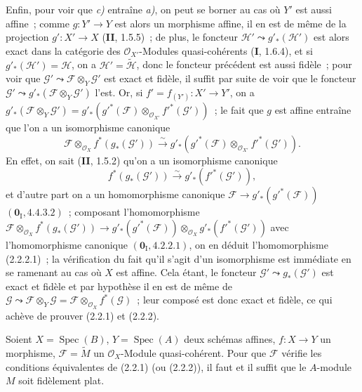 Enfin, pour voir que \emph{c)} entraîne \emph{a)}, on peut se borner au cas
où $Y'$ est aussi affine~; comme $g:Y'\to Y$ est alors un morphisme affine,
il en est de même de la projection $g':X'\to X$ (\textbf{II}, 1.5.5)~; de plus, le
foncteur $\mathscr H'\leadsto g'_*(\mathscr H')$ est alors exact dans la
catégorie des $\mathcal O_{X'}$-Modules quasi-cohérents (\textbf{I}, 1.6.4), et si
$g'_*(\mathscr H')=\mathscr H$, on a $\mathscr H'=\widetilde{\mathscr H}$,
donc le foncteur précédent est aussi fidèle~; pour voir que
$\mathscr G'\leadsto\mathscr F\otimes_Y\mathscr G'$ est exact et fidèle, il
suffit par suite de voir que le foncteur
$\mathscr G'\leadsto g'_*(\mathscr F\otimes_Y\mathscr G')$
l'est. Or, si $f'=f_{(Y')}:X'\to Y'$, on a
$g'_*(\mathscr F\otimes_Y\mathscr G')
=g'_*(g'^*(\mathscr F)\otimes_{\mathcal O_{X'}}f'^*(\mathscr G'))$~; le fait que $g$ est
affine entraîne que l'on a un isomorphisme canonique
\begin{equation}
\tag{2.2.2.1}
\label{IV.2.2.2.1-fr}
\mathscr F\otimes_{\mathcal O_X}f^*(g_*(\mathscr G'))
\xrightarrow{\sim}
g'_*(g'^*(\mathscr F)\otimes_{\mathcal O_{X'}}f'^*(\mathscr G')).
\end{equation}
En effet, on sait (\textbf{II}, 1.5.2) qu'on a un isomorphisme canonique
\[
f^*(g_*(\mathscr G'))\xrightarrow{\sim}g'_*(f'^*(\mathscr G')),
\]
et d'autre part on a un homomorphisme canonique
$\mathscr F\to g'_*(g'^*(\mathscr F))$ $(\mathbf{0}_{\mathrm I},4.4.3.2)$~;
composant l'homomorphisme
$\mathscr F\otimes_{\mathcal O_X}f^*(g_*(\mathscr G'))
\to g'_*(g'^*(\mathscr F))\otimes_{\mathcal O_X}g'_*(f'^*(\mathscr G'))$
avec l'homomorphisme canonique $(\mathbf{0}_{\mathrm I},4.2.2.1)$, on en déduit
l'homomorphisme (2.2.2.1)~; la vérification du fait qu'il s'agit d'un
isomorphisme est immédiate en se ramenant au cas où $X$ est affine. Cela
étant, le foncteur $\mathscr G'\leadsto g_*(\mathscr G')$ est exact et fidèle
et par hypothèse il en est de même de
$\mathscr G\leadsto\mathscr F\otimes_Y\mathscr G
=\mathscr F\otimes_{\mathcal O_X}f^*(\mathscr G)$~; leur composé est donc
exact et fidèle, ce qui achève de prouver (2.2.1) et (2.2.2).

\begin{corollary}[2.2.3]
\label{IV.2.2.3-fr}
Soient $X=\operatorname{Spec}(B)$, $Y=\operatorname{Spec}(A)$ deux schémas
affines, $f:X\to Y$ un morphisme, $\mathscr F=\widetilde M$ un
$\mathcal O_X$-Module quasi-cohérent. Pour que $\mathscr F$ vérifie les
conditions équivalentes de \textup{(2.2.1)} (ou \textup{(2.2.2)}), il faut et il suffit que le
$A$-module $M$ soit fidèlement plat.
\end{corollary}

